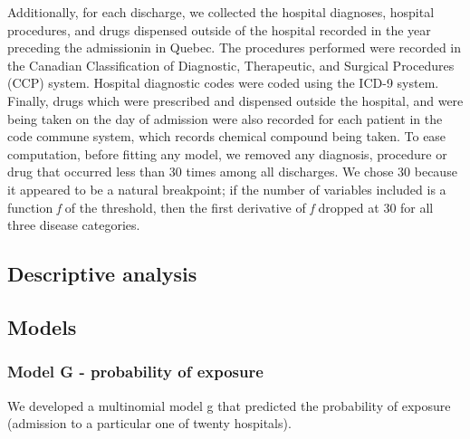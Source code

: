 \documentclass[]{article}
\begin{document}
Additionally, for each discharge, we collected the hospital diagnoses, hospital procedures, and drugs dispensed outside of the hospital recorded in the year preceding the admissionin in Quebec. The procedures performed were recorded in the Canadian Classification of Diagnostic, Therapeutic, and Surgical Procedures (CCP) system. Hospital diagnostic codes were coded using the ICD-9 system. Finally, drugs which were prescribed and dispensed outside the hospital, and were being taken on the day of admission were also recorded for each patient in the code commune system, which records chemical compound being taken. To ease computation, before fitting any model, we removed any diagnosis, procedure or drug that occurred less than 30 times among all discharges. We chose 30 because it appeared to be a natural breakpoint; if the number of variables included is a function \emph{f} of the threshold, then the first derivative of \emph{f} dropped at 30 for all three disease categories.


\subsection{Descriptive analysis}

\subsection{Models}
\subsubsection{Model G - probability of exposure}
We developed a multinomial model g that predicted the probability of exposure (admission to a particular one of twenty hospitals). 
\end{document}
